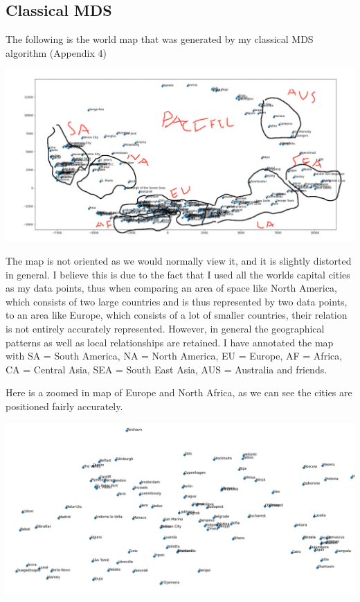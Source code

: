 \documentclass[11pt,a4paper,landscape]{article}
\begin{document}
\subsection{Classical MDS}

The following is the world map that was generated by my classical MDS algorithm (Appendix 4)
\begin{center}
	\includegraphics[scale= .4]{annotated_world_map.jpg}
\end{center}

The map is not oriented as we would normally view it, and it is slightly distorted in general. I believe this is due to the fact that I used all the worlds capital cities as my data points, thus when comparing an area of space like North America, which consists of two large countries and is thus represented by two data points, to an area like Europe, which consists of a lot of smaller countries, their relation is not entirely accurately represented. However, in general the geographical patterns as well as local relationships are retained. I have annotated the map with SA = South America, NA = North America, EU = Europe, AF = Africa, CA = Central Asia, SEA = South East Asia, AUS = Australia and friends. \newline

Here is a zoomed in map of Europe and North Africa, as we can see the cities are positioned fairly accurately.

\begin{center}
	\includegraphics[scale= 0.6]{eu_af.png}
\end{center}
\end{document}
